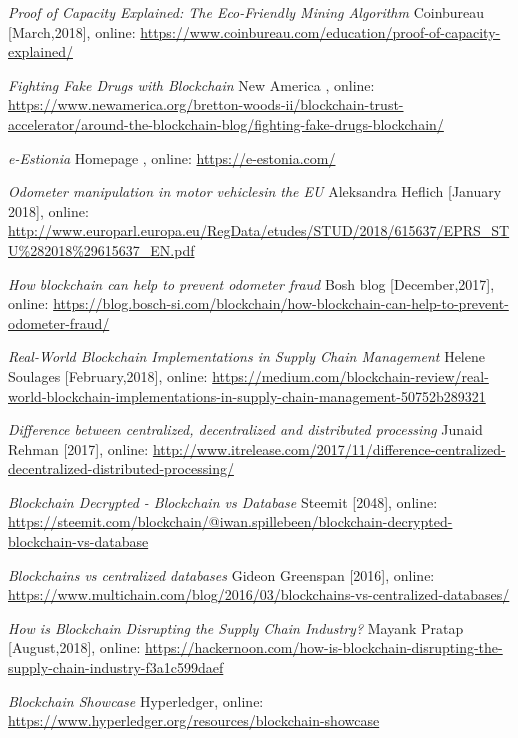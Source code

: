 \begin{thebibliography}{99}
\textit{Proof of Capacity Explained: The Eco-Friendly Mining Algorithm} Coinbureau [March,2018], online: 
\url{https://www.coinbureau.com/education/proof-of-capacity-explained/}

\textit{Fighting Fake Drugs with Blockchain} New America , online: 
\url{https://www.newamerica.org/bretton-woods-ii/blockchain-trust-accelerator/around-the-blockchain-blog/fighting-fake-drugs-blockchain/}

\textit{e-Estionia} Homepage , online: 
\url{https://e-estonia.com/}

\textit{Odometer manipulation in motor vehiclesin the EU} Aleksandra Heflich  [January 2018], online: 
\url{http://www.europarl.europa.eu/RegData/etudes/STUD/2018/615637/EPRS_STU\%282018\%29615637_EN.pdf}

\textit{How blockchain can help to prevent odometer fraud} Bosh blog [December,2017], online: 
\url{https://blog.bosch-si.com/blockchain/how-blockchain-can-help-to-prevent-odometer-fraud/}

\textit{Real-World Blockchain Implementations in Supply Chain Management} Helene Soulages [February,2018], online: 
\url{https://medium.com/blockchain-review/real-world-blockchain-implementations-in-supply-chain-management-50752b289321}

\textit{Difference between centralized, decentralized and distributed processing} Junaid Rehman [2017], online: 
\url{http://www.itrelease.com/2017/11/difference-centralized-decentralized-distributed-processing/}

\textit{Blockchain Decrypted - Blockchain vs Database} Steemit  [2048], online: 
\url{https://steemit.com/blockchain/@iwan.spillebeen/blockchain-decrypted-blockchain-vs-database}

\textit{Blockchains vs centralized databases}  Gideon Greenspan [2016], online: 
\url{https://www.multichain.com/blog/2016/03/blockchains-vs-centralized-databases/}

\textit{How is Blockchain Disrupting the Supply Chain Industry?} Mayank Pratap [August,2018], online: 
\url{https://hackernoon.com/how-is-blockchain-disrupting-the-supply-chain-industry-f3a1c599daef}


\textit{Blockchain Showcase} Hyperledger, online: 
\url{https://www.hyperledger.org/resources/blockchain-showcase}


\end{thebibliography}
